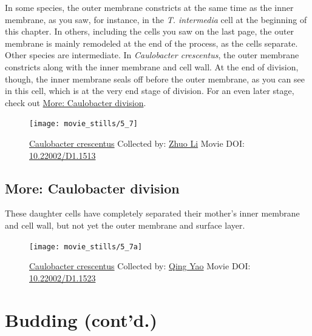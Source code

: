 \documentclass[]{tufte-book}
\begin{document}
In some species, the outer membrane constricts at the same time as the
inner membrane, as you saw, for instance, in the \emph{T. intermedia}
cell at the beginning of this chapter. In others, including the cells
you saw on the last page, the outer membrane is mainly remodeled at the
end of the process, as the cells separate. Other species are
intermediate. In \emph{Caulobacter crescentus}, the outer membrane
constricts along with the inner membrane and cell wall. At the end of
division, though, the inner membrane seals off before the outer
membrane, as you can see in this cell, which is at the very end stage of
division. For an even later stage, check out
\protect\hyperlink{Caulobacter_division}{More: Caulobacter division}.





\begin{figure}
\texttt{[image: movie\_stills/5\_7]} \caption[\protect\hyperlink{tree}{Caulobacter crescentus} Collected by:
\protect\hyperlink{zhuo_li}{Zhuo Li} Movie DOI:
\href{https://doi.org/10.22002/D1.1513}{10.22002/D1.1513}]{\protect\hyperlink{tree}{Caulobacter crescentus} Collected by:
\protect\hyperlink{zhuo_li}{Zhuo Li} Movie DOI:
\href{https://doi.org/10.22002/D1.1513}{10.22002/D1.1513}}\label{fig:5-7}
\end{figure}

\hypertarget{Caulobacter_division}{\subsection*{More: Caulobacter
division}\label{Caulobacter_division}}

These daughter cells have completely separated their mother's inner
membrane and cell wall, but not yet the outer membrane and surface
layer.





\begin{figure}
\texttt{[image: movie\_stills/5\_7a]} \caption[\protect\hyperlink{tree}{Caulobacter crescentus} Collected
by: \protect\hyperlink{qing_yao}{Qing Yao} Movie DOI:
\href{https://doi.org/10.22002/D1.1523}{10.22002/D1.1523}]{\protect\hyperlink{tree}{Caulobacter crescentus} Collected
by: \protect\hyperlink{qing_yao}{Qing Yao} Movie DOI:
\href{https://doi.org/10.22002/D1.1523}{10.22002/D1.1523}}\label{fig:5-7a}
\end{figure}

\section{Budding (cont'd.)}\label{budding-contd.}
\end{document}
